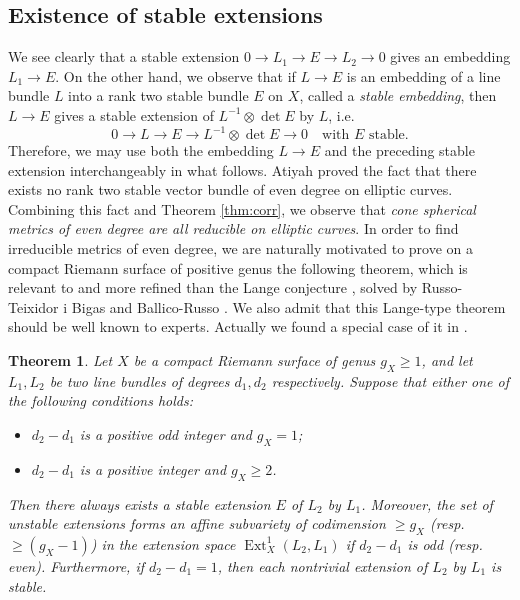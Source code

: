 \documentclass[12pt]{article}
\newtheorem{thm}{Theorem}[section]
\begin{document}
\subsection{Existence of stable extensions}
We see clearly that a stable extension $0\to L_1\to E\to L_2\to 0$ gives an embedding $L_1\to E$. On the other hand, we observe that if $L \to E$ is an embedding of a line bundle $L$ into a rank two stable bundle $E$ on $X$, called a {\it stable embedding},  then $L \to E$ gives a stable extension of $L^{-1} \otimes \det E$ by $L$, i.e.
\[ 0 \to L\rightarrow E \rightarrow L^{-1} \otimes \det E \to 0 \quad \text{with $E$ stable}. \]
Therefore, we may use both the embedding $L \to E$ and the preceding stable extension interchangeably in what follows.
Atiyah \cite{Atiyah57II} proved the fact that there exists no rank two stable vector bundle of even degree on  elliptic curves. Combining this fact and Theorem \ref{thm:corr}, we observe that {\it cone spherical metrics of even degree are all reducible on elliptic curves}. In order to find irreducible metrics of even degree,  we are naturally motivated to prove on a compact Riemann surface of positive genus  the following theorem, which is relevant to and more refined than the Lange conjecture \cite[p.452]{Lan83}, solved by Russo-Teixidor i Bigas \cite{RT99} and Ballico-Russo \cite{Ba2000, BR98}.
We also admit that this Lange-type theorem should be well known to experts. Actually we found a special case of it in \cite[Corollary 1.2]{LN83}.

\begin{thm}
\label{thm:stable}
Let $X$ be a compact Riemann surface of genus $g_{X}\geq 1$, and let $L_{1}, L_{2}$ be two line bundles of degrees $d_{1}, d_{2}$ respectively. Suppose that either one of the following conditions holds:
\begin{itemize}
\item $d_{2} - d_{1}$ is a positive odd integer and $g_{X}=1$;
\item $d_{2} - d_{1}$ is a positive integer and $g_{X} \geq 2$.
\end{itemize}
Then there always exists a stable extension $E$ of $L_{2}$ by $L_{1}$.
Moreover, the set of unstable extensions forms an affine subvariety of codimension $\geq g_{X}$ {\rm \big(}resp. $\geq (g_{X} - 1)${\rm \big)} in the extension space $\operatorname{Ext}_{X}^{1}(L_{2}, L_{1})$ if $d_{2} - d_{1}$ is odd (resp. even).
Furthermore, if $d_{2} - d_{1} = 1$, then each nontrivial extension of $L_2$ by $L_1$ is stable.
\end{thm}
\end{document}
